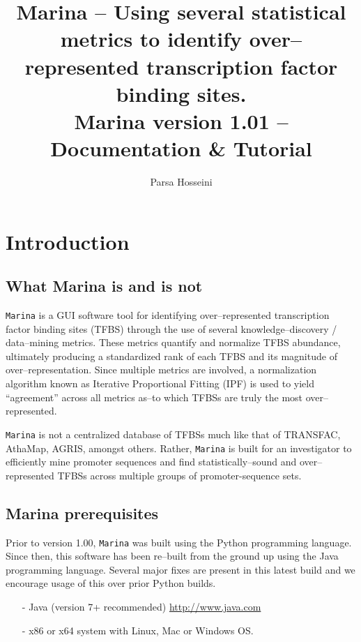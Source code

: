 \documentclass{article}
\begin{document}
\title{Marina -- Using several statistical metrics to identify over--represented 
transcription factor binding sites. \\ \small{Marina version 1.01 -- Documentation \& Tutorial}}
\author{Parsa Hosseini}
\maketitle
\tableofcontents %
\pagebreak

\section{Introduction}
\subsection{What Marina is and is not}
\texttt{Marina} is a GUI software tool for identifying over--represented transcription factor
binding sites (TFBS) through the use of several knowledge--discovery / data--mining metrics. 
These metrics quantify and normalize TFBS abundance, ultimately producing a 
standardized rank of each TFBS and its magnitude of over--representation. Since
multiple metrics are involved, a normalization algorithm known as 
Iterative Proportional Fitting (IPF) is used to yield ``agreement'' across all
metrics as--to which TFBSs are truly the most over--represented.

\texttt{Marina} is not a centralized database of TFBSs much like that of TRANSFAC, 
AthaMap, AGRIS, amongst others. Rather, \texttt{Marina} is built for an 
investigator to efficiently mine promoter sequences and find
statistically--sound and over--represented TFBSs across multiple groups of promoter-sequence sets.

\subsection{Marina prerequisites}
Prior to version 1.00, \texttt{Marina} was built using the Python programming
language. Since then, this software has been re--built from the ground up using
the Java programming language. Several major fixes are present in this latest
build and we encourage usage of this over prior Python builds.
\begin{itemize}
  \item[-] Java (version 7+ recommended) \url{http://www.java.com}
  \item[-] x86 or x64 system with Linux, Mac or Windows OS.
\end{itemize}
\end{document}
